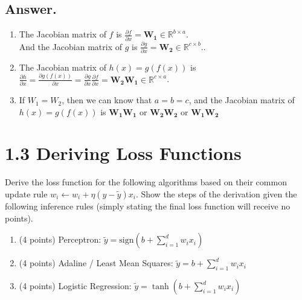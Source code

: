 \documentclass{article}
\begin{document}
\begin{itemize}
    \subsection*{Answer.}
    \begin{enumerate}
        \item The Jacobian matrix of \(f\) is \(\frac{\partial f}{\partial x} = \boldsymbol{W_1} \in \mathbb{R}^{b \times a}\).\\
        And the Jacobian matrix of \(g\) is \(\frac{\partial g}{\partial x} = \boldsymbol{W_2} \in \mathbb{R}^{c \times b}\)..
        \item The Jacobian matrix of \(h(x) = g(f(x))\) is \(\frac{\partial h}{\partial x} = \frac{\partial g(f(x))}{\partial x} = \frac{\partial g}{\partial x} \frac{\partial f}{\partial x} = \boldsymbol{W_2} \boldsymbol{W_1} \in \mathbb{R}^{c \times a}\).
        \item If \(W_1 = W_2\), then we can know that \(a = b = c\), and the Jacobian matrix of \(h(x) = g(f(x))\) is \(\boldsymbol{W_1} \boldsymbol{W_1} \) or \(\boldsymbol{W_2} \boldsymbol{W_2} \) or \(\boldsymbol{W_1} \boldsymbol{W_2}\)
    \end{enumerate}



\end{itemize}

\section*{1.3 Deriving Loss Functions}

Derive the loss function for the following algorithms based on their common update rule $w_i \leftarrow w_i + \eta (y - \tilde{y}) x_i$. Show the steps of the derivation given the following inference rules (simply stating the final loss function will receive no points).

\begin{enumerate}
    \item (4 points) Perceptron: $\tilde{y} = \text{sign}(b + \sum_{i=1}^{d} w_i x_i)$
    \item (4 points) Adaline / Least Mean Squares: $\tilde{y} = b + \sum_{i=1}^{d} w_i x_i$
    \item (4 points) Logistic Regression: $\tilde{y} = \tanh(b + \sum_{i=1}^{d} w_i x_i)$
\end{enumerate}

\end{document}
